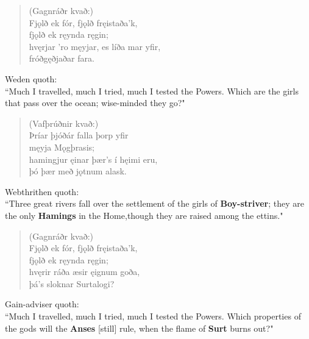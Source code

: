 \begin{verse}
(Gagnráðr kvað:) \\%
\bva Fjǫlð ek fór, \hld fjǫlð fręistaða'k, \\%
\ind fjǫlð ek ręynda ręgin; \\%
hvęrjar 'ro męyjar, \hld es líða mar yfir, \\%
\ind fróðgęðjaðar fara.\\%
\end{verse}

\bvb Weden quoth: \\ “Much I travelled, much I tried, much I tested the Powers. Which are the girls that pass over the ocean; wise-minded they go?" \\

\begin{verse}
(Vafþrúðnir kvað:) \\%
\bva Þríar þjóðár \hld falla þorp yfir \\%
\ind męyja Mǫgþrasis; \\%
hamingjur ęinar \hld þær's í hęimi eru, \\%
\ind þó þær með jǫtnum alask.\\%
\end{verse}

\bvb Webthrithen quoth: \\ “Three great rivers fall over the settlement of the girls of \textbf{Boy-striver}; they are the only \textbf{Hamings} in the Home,\footnotemark[99] though they are raised among the ettins\footnotemark[100]." \\

\begin{verse}
(Gagnráðr kvað:) \\%
\bva Fjǫlð ek fór, \hld fjǫlð fręistaða'k, \\%
\ind fjǫlð ek ręynda ręgin; \\%
hvęrir ráða æsir \hld ęignum goða, \\%
\ind þá's sloknar Surtalogi?\\%
\end{verse}

\bvb Gain-adviser quoth: \\ “Much I travelled, much I tried, much I tested the Powers. Which properties of the gods will the \textbf{Anses} [still] rule\footnotemark[105], when the flame of \textbf{Surt} burns out?" \\

